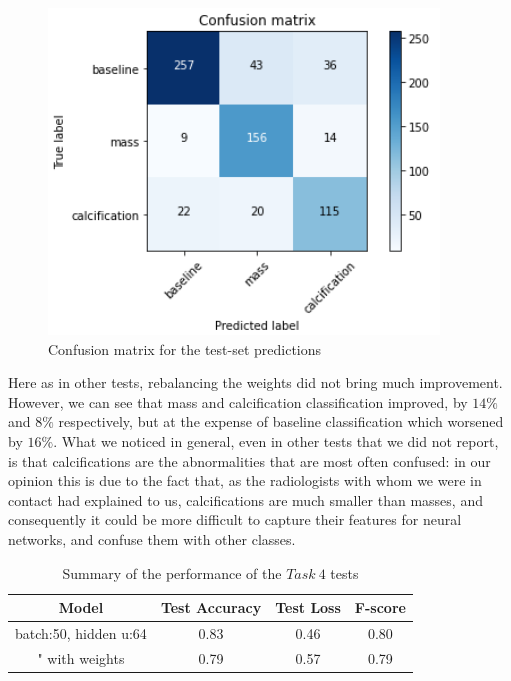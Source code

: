 \documentclass[11pt,a4paper,oneside]{article}
\begin{document}
\begin{figure}[h]
\begin{minipage}[c]{.4\textwidth}
		\label{fig:4_acc_w}
	\end{minipage}
	\hspace{5mm}%
	\begin{minipage}[c]{.4\textwidth}
		\centering\setlength{\captionmargin}{0pt}%
		\includegraphics[width=.9\textwidth]{images/4.1/2_matrix}
		\caption{Confusion matrix for the test-set predictions}
		\label{fig:4_matrix_w}
	\end{minipage}%
\end{figure}

Here as in other tests, rebalancing the weights did not bring much improvement. However, we can see that mass and calcification classification improved, by $14\%$ and $8\%$ respectively, but at the expense of baseline classification which worsened by $16\%$. What we noticed in general, even in other tests that we did not report, is that calcifications are the abnormalities that are most often confused: in our opinion this is due to the fact that, as the radiologists with whom we were in contact had explained to us, calcifications are much smaller than masses, and consequently it could be more difficult to capture their features for neural networks, and confuse them with other classes.

\begin{table}
\centering
	\begin{tabular}{|cccc|}
	\hline
	Model & Test Accuracy & Test Loss & F-score \\
	\hline
	batch:50, hidden u:64 & 0.83 & 0.46 & 0.80 \\
	"    with weights & 0.79 & 0.57 & 0.79 \\
	\hline
	\end{tabular}
\caption{Summary of the performance of the $Task\ 4$ tests}
\end{table}
\end{document}
